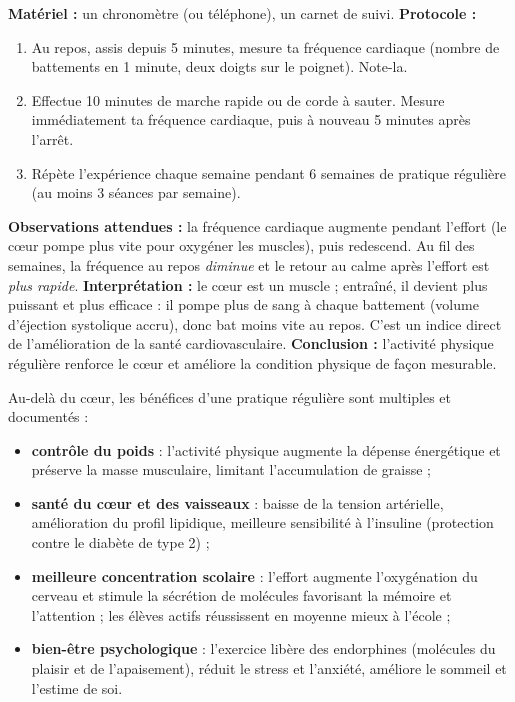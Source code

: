 \documentclass[11pt]{article}
\newcommand{\cle}[1]{{\popxbold\color{popdark}#1}}
\begin{document}
\begin{experience}
\textbf{Matériel :} un chronomètre (ou téléphone), un carnet de suivi.
\textbf{Protocole :}
\begin{enumerate}
\item Au repos, assis depuis 5 minutes, mesure ta fréquence cardiaque (nombre de battements en 1 minute, deux doigts sur le poignet). Note-la.
\item Effectue 10 minutes de marche rapide ou de corde à sauter. Mesure immédiatement ta fréquence cardiaque, puis à nouveau 5 minutes après l'arrêt.
\item Répète l'expérience chaque semaine pendant 6 semaines de pratique régulière (au moins 3 séances par semaine).
\end{enumerate}
\textbf{Observations attendues :} la fréquence cardiaque augmente pendant l'effort (le cœur pompe plus vite pour oxygéner les muscles), puis redescend. Au fil des semaines, la fréquence au repos \emph{diminue} et le retour au calme après l'effort est \emph{plus rapide}.
\textbf{Interprétation :} le cœur est un muscle ; entraîné, il devient plus puissant et plus efficace : il pompe plus de sang à chaque battement (volume d'éjection systolique accru), donc bat moins vite au repos. C'est un indice direct de l'amélioration de la santé cardiovasculaire.
\textbf{Conclusion :} l'activité physique régulière renforce le cœur et améliore la condition physique de façon mesurable.
\end{experience}

Au-delà du cœur, les bénéfices d'une pratique régulière sont multiples et documentés :
\begin{itemize}
\item \textbf{contrôle du poids} : l'activité physique augmente la dépense énergétique et préserve la masse musculaire, limitant l'accumulation de graisse ;
\item \textbf{santé du cœur et des vaisseaux} : baisse de la tension artérielle, amélioration du profil lipidique, meilleure sensibilité à l'insuline (protection contre le diabète de type 2) ;
\item \textbf{meilleure concentration scolaire} : l'effort augmente l'oxygénation du cerveau et stimule la sécrétion de molécules favorisant la mémoire et l'attention ; les élèves actifs réussissent en moyenne mieux à l'école ;
\item \textbf{bien-être psychologique} : l'exercice libère des \cle{endorphines} (molécules du plaisir et de l'apaisement), réduit le stress et l'anxiété, améliore le sommeil et l'estime de soi.
\end{itemize}
\end{document}
